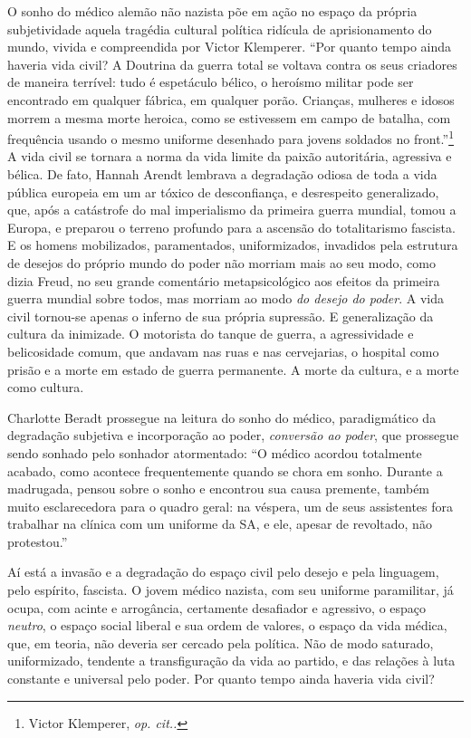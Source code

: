 O sonho do médico alemão não nazista põe em ação no espaço da própria
subjetividade aquela tragédia cultural política ridícula de
aprisionamento do mundo, vivida e compreendida por Victor Klemperer.
``Por quanto tempo ainda haveria vida civil? A Doutrina da guerra total
se voltava contra os seus criadores de maneira terrível: tudo é
espetáculo bélico, o heroísmo militar pode ser encontrado em qualquer
fábrica, em qualquer porão. Crianças, mulheres e idosos morrem a mesma
morte heroica, como se estivessem em campo de batalha, com frequência
usando o mesmo uniforme desenhado para jovens soldados no
front.''\footnote{Victor Klemperer, \emph{op. cit..}} A vida civil se
tornara a norma da vida limite da paixão autoritária, agressiva e
bélica. De fato, Hannah Arendt lembrava a degradação odiosa de toda a
vida pública europeia em um ar tóxico de desconfiança, e desrespeito
generalizado, que, após a catástrofe do mal imperialismo da primeira
guerra mundial, tomou a Europa, e preparou o terreno profundo para a
ascensão do totalitarismo fascista. E os homens mobilizados,
paramentados, uniformizados, invadidos pela estrutura de desejos do
próprio mundo do poder não morriam mais ao seu modo, como dizia Freud,
no seu grande comentário metapsicológico aos efeitos da primeira guerra
mundial sobre todos, mas morriam ao modo \emph{do desejo do poder}. A
vida civil tornou-se apenas o inferno de sua própria supressão. E
generalização da cultura da inimizade. O motorista do tanque de guerra,
a agressividade e belicosidade comum, que andavam nas ruas e nas
cervejarias, o hospital como prisão e a morte em estado de guerra
permanente. A morte da cultura, e a morte como cultura.

Charlotte Beradt prossegue na leitura do sonho do médico, paradigmático
da degradação subjetiva e incorporação ao poder, \emph{conversão ao
poder}, que prossegue sendo sonhado pelo sonhador atormentado: ``O
médico acordou totalmente acabado, como acontece frequentemente quando
se chora em sonho. Durante a madrugada, pensou sobre o sonho e encontrou
sua causa premente, também muito esclarecedora para o quadro geral: na
véspera, um de seus assistentes fora trabalhar na clínica com um
uniforme da SA, e ele, apesar de revoltado, não protestou.''

Aí está a invasão e a degradação do espaço civil pelo desejo e pela
linguagem, pelo espírito, fascista. O jovem médico nazista, com seu
uniforme paramilitar, já ocupa, com acinte e arrogância, certamente
desafiador e agressivo, o espaço \emph{neutro}, o espaço social liberal
e sua ordem de valores, o espaço da vida médica, que, em teoria, não
deveria ser cercado pela política. Não de modo saturado, uniformizado,
tendente a transfiguração da vida ao partido, e das relações à luta
constante e universal pelo poder. Por quanto tempo ainda haveria vida
civil?

